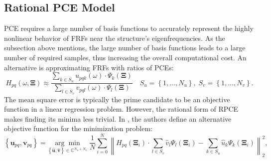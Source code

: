%
%

\subsection{Rational PCE Model}
\label{ssec: RPCE}

PCE requires a large number of basis functions to accurately represent the highly nonlinear behavior of FRFs near the structure's eigenfrequencies.
As the subsection above mentions, the large number of basis functions leads to a large number of required samples, thus increasing the overall computational cost.
{An alternative is approximating FRFs with ratios of PCEs:}%
\begin{equation}
    H_{pq} \left( \omega, \mathbf{\Xi} \right)
    \approx
    \frac{
        \sum_{k\in S_{u}}{
            u_{pqk}\left(\omega\right)
            \cdot
            \Psi_{k} \left( \mathbf{\Xi} \right)
        }
    }{
        \sum_{l\in S_{v}}{
            v_{pql}\left(\omega\right)
            \cdot
            \Psi_{l} \left( \mathbf{\Xi} \right)
        }
    }
    \quad
    S_{u} = \left\{1, ..., N_{u}\right\},
    \;
    S_{v} = \left\{1, ..., N_{v}\right\}
    .
    \label{RPCE_approx}
\end{equation}
The mean square error is typically the prime candidate to be an objective function in a linear regression problem.
However, the rational form of RPCE makes finding its minima less trivial.
{In \cite{schneider2020polynomial}, the authors define an alternative objective function for the minimization problem:}%
\begin{equation}
    \left\{
        \mathbf{u}_{pq},
        \mathbf{v}_{pq}
    \right\}
    =
    \underset{
        \left\{
            \hat{\mathbf{u}},
            \hat{\mathbf{v}}
        \right\}
        \in 
        \mathbb{C}^{N_{u}+N_{v}}
    }{\arg\min}
    \;
    \frac{1}{N}
    \sum_{i=0}^{N}
    \left\|
        H_{pq} \left( \mathbf{\Xi}_{i} \right)
        \cdot
        \sum_{l\in S_{v}}{
            \hat{v}_{l} \Psi_{l} \left( \mathbf{\Xi}_{i} \right)
        }
        -
        \sum_{k\in S_{u}}{
            \hat{u}_{k} \Psi_{k} \left( \mathbf{\Xi}_{i} \right)
        }
    \right\|_{2}^{2},
\end{equation}
